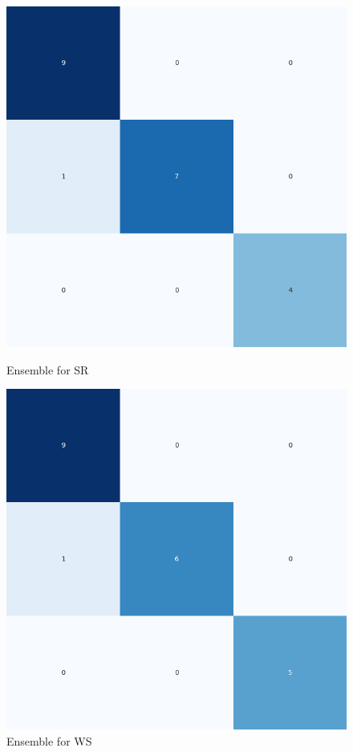 \begin{figure}[H]
    \centering
    \begin{minipage}[b]{0.45\textwidth}
        \includegraphics[width=\textwidth]{./class_specificxtra_section/ensemble_plots/ensemble_confusion_matrix_SR.png}
        \caption{Ensemble for SR}
        \label{fig_class:specxtra_ensemble_sr}
    \end{minipage}
    \hfill
    \begin{minipage}[b]{0.45\textwidth}
        \includegraphics[width=\textwidth]{./class_specificxtra_section/ensemble_plots/ensemble_confusion_matrix_WS.png}
        \caption{Ensemble for WS}
        \label{fig_class:specxtra_ensemble_ws}
    \end{minipage}
\end{figure}

